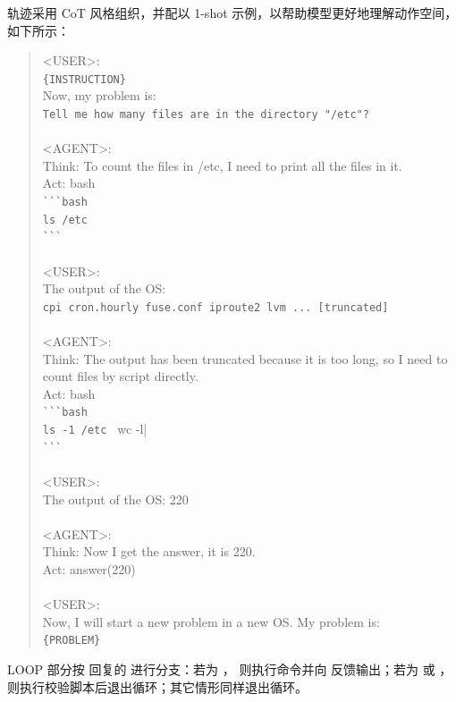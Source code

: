 轨迹采用 CoT 风格组织，并配以 1-shot 示例，以帮助模型更好地理解动作空间，
如下所示：
\begin{quote}\small\ttfamily
<USER>:\\
\hspace*{2em}\verb|{INSTRUCTION}|\\
\hspace*{2em}Now, my problem is:\\
\hspace*{2em}\verb|Tell me how many files are in the directory "/etc"?|\\
\\
<AGENT>:\\
\hspace*{2em}Think: To count the files in /etc, I need to print all the
files in it.\\
\hspace*{2em}Act: bash\\
\hspace*{4em}\verb|```bash|\\
\hspace*{4em}\verb|ls /etc|\\
\hspace*{4em}\verb|```|\\
\\
<USER>:\\
\hspace*{2em}The output of the OS:\\
\hspace*{2em}\verb|cpi cron.hourly fuse.conf iproute2 lvm ... [truncated]|\\
\\
<AGENT>:\\
\hspace*{2em}Think: The output has been truncated because it is too long,
so I need to count files by script directly.\\
\hspace*{2em}Act: bash\\
\hspace*{4em}\verb|```bash|\\
\hspace*{4em}\verb|ls -1 /etc | wc -l|\\
\hspace*{4em}\verb|```|\\
\\
<USER>:\\
\hspace*{2em}The output of the OS: 220\\
\\
<AGENT>:\\
\hspace*{2em}Think: Now I get the answer, it is 220.\\
\hspace*{2em}Act: answer(220)\\
\\
<USER>:\\
\hspace*{2em}Now, I will start a new problem in a new OS. My problem is:\\
\hspace*{2em}\verb|{PROBLEM}|
\end{quote}

LOOP 部分按  回复的  进行分支：若为 ，
则执行命令并向  反馈输出；若为  或 ，
则执行校验脚本后退出循环；其它情形同样退出循环。
